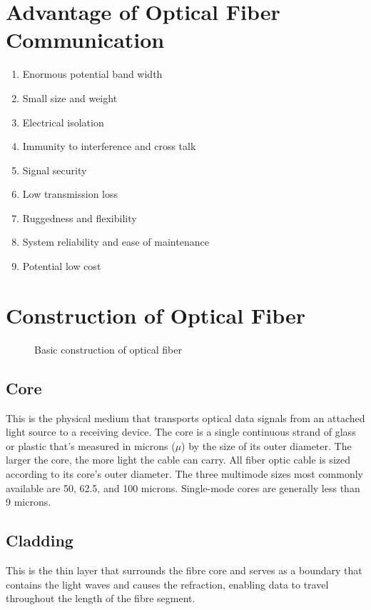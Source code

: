 \documentclass[12pt]{report}
\begin{document}
	\section{Advantage of Optical Fiber Communication }
	\begin{enumerate}
			\item Enormous potential band width 
			\item  Small size and weight 
			\item  Electrical isolation 
			\item  Immunity to interference and cross talk 
			\item  Signal security 
			\item  Low transmission loss 
			\item  Ruggedness and flexibility 
			\item  System reliability and ease of maintenance 
			\item  Potential low cost
	\end{enumerate}
 
	\section{Construction of Optical Fiber}
	\begin{figure}[htbp]
		\caption{Basic construction of optical fiber}
		\label{fig:of_cable}
	\end{figure}
	\subsection*{Core}
	This is the physical medium that transports optical data signals from an attached light source to a receiving device. The core is a single continuous strand of glass or plastic that’s measured in microns ($\mu$) by the size of its outer diameter. The larger the core, the more light the cable can carry. All fiber optic cable is sized according to its core’s outer diameter. The three multimode sizes most commonly available are 50, 62.5, and 100 microns. Single-mode cores are generally less than 9 microns.
	\subsection*{Cladding}
	This is the thin layer that surrounds the fibre core and serves as a boundary that contains the light waves and causes the refraction, enabling data to travel throughout the length of the fibre segment. 
\end{document}

